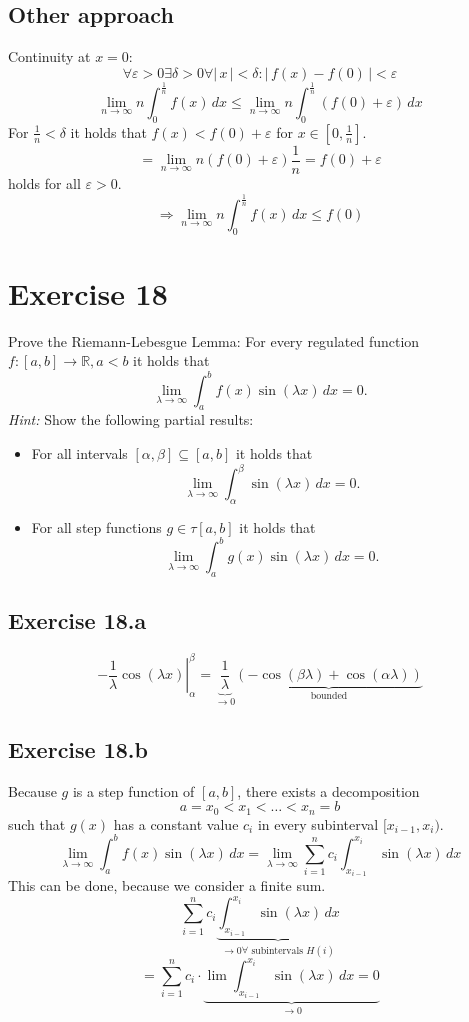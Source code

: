 \documentclass[a4paper]{article}
\theoremstyle{definition}
\newcommand\abs[1]{\left|\,#1\,\right|}
\begin{document}
\subsection{Other approach}
Continuity at $x=0$:
\[
  \forall \varepsilon > 0 \exists \delta > 0 \forall \abs{x} < \delta:
  \abs{f(x) - f(0)} < \varepsilon
\] \[
  \lim_{n\to\infty} n \int_0^{\frac1n} f(x) \, dx
  \leq \lim_{n\to\infty} n \int_0^{\frac1n} (f(0) + \varepsilon) \, dx
\]
For $\frac1n < \delta$ it holds that $f(x) < f(0) + \varepsilon$ for $x \in [0,\frac1n]$.
\[
  = \lim_{n\to\infty} n (f(0) + \varepsilon) \frac1n
  = f(0) + \varepsilon
\]
holds for all $\varepsilon > 0$.
\[
  \Rightarrow
  \lim_{n\to\infty} n \int_0^{\frac1n} f(x) \, dx \leq f(0)
\]

\section{Exercise 18}
\begin{ex}
  Prove the Riemann-Lebesgue Lemma:
  For every regulated function $f: [a,b] \to \mathbb R, a < b$ it holds that
  \[ \lim_{\lambda\to\infty} \int_a^b f(x) \sin(\lambda x) \, dx = 0. \]
  \emph{Hint:} Show the following partial results:
  \begin{itemize}
    \item For all intervals $[\alpha, \beta] \subseteq [a,b]$ it holds that
      \[ \lim_{\lambda\to\infty} \int_\alpha^\beta \sin(\lambda x)\, dx = 0. \]
    \item For all step functions $g \in \tau[a,b]$ it holds that
      \[ \lim_{\lambda\to\infty} \int_a^b g(x) \sin(\lambda x) \, dx = 0. \]
  \end{itemize}
\end{ex}

\subsection{Exercise 18.a}
\[
  \left.-\frac1\lambda \cos(\lambda x)\right|_\alpha^\beta
  = \underbrace{\frac1{\lambda}}_{\to 0} \underbrace{\left(-\cos(\beta \lambda) + \cos(\alpha\lambda)\right)}_{\text{bounded}}
\]


\subsection{Exercise 18.b}
Because $g$ is a step function of $[a,b]$, there exists a decomposition
\[ a = x_0 < x_1 < \ldots < x_n = b \]
such that $g(x)$ has a constant value $c_i$ in every subinterval $[x_{i-1}, x_i)$.
\[
  \lim_{\lambda\to\infty} \int_a^b f(x) \sin(\lambda x) \, dx
  = \lim_{\lambda\to\infty} \sum_{i=1}^n c_i \int_{x_{i-1}}^{x_i} \sin(\lambda x) \, dx
\]
This can be done, because we consider a finite sum.
\[
  \sum_{i=1}^n c_i \underbrace{\int_{x_{i-1}}^{x_i} \sin(\lambda x) \, dx}_{\to 0 \forall \text{ subintervals } H(i)}
\] \[
  = \sum_{i=1}^n c_i \cdot \underbrace{\lim \int_{x_{i-1}}^{x_i} \sin(\lambda x) \, dx = 0}_{\to 0}
\]
\end{document}
